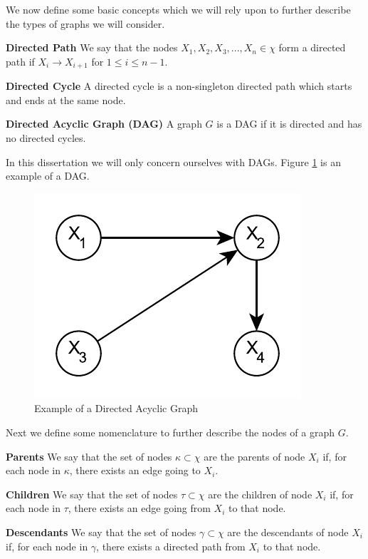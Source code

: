 \documentclass[../masters.tex]{subfiles}
\begin{document}
We now define some basic concepts which we will rely upon to further describe the types of graphs we will consider.
\begin{defn}
\textbf{Directed Path} We say that the nodes $X_1, X_2, X_3,..., X_n \in \chi$ form a directed path if $X_i \rightarrow X_{i+1}$ for $1 \leq i \leq n-1$. 
\end{defn}
\begin{defn}
\textbf{Directed Cycle} A directed cycle is a non-singleton directed path which starts and ends at the same node.
\end{defn}
\begin{defn}
\textbf{Directed Acyclic Graph (DAG)} A graph $G$ is a DAG if it is directed and has no directed cycles.
\end{defn}
In this dissertation we will only concern ourselves with DAGs. Figure \ref{fig_dag} is an example of a DAG.
\begin{figure}[H] 
\centering
\includegraphics[scale=1.0]{dag.pdf}
\caption{Example of a Directed Acyclic Graph}
\label{fig_dag}
\end{figure}
Next we define some nomenclature to further describe the nodes of a graph $G$.
\begin{defn}
\textbf{Parents} We say that the set of nodes $\kappa \subset \chi$ are the parents of node $X_i$ if, for each node in $\kappa$, there exists an edge going to $X_i$.
\end{defn}
\begin{defn}
\textbf{Children} We say that the set of nodes $\tau \subset \chi$ are the children of node $X_i$ if, for each node in $\tau$, there exists an edge going from $X_i$ to that node.
\end{defn}
\begin{defn}
\textbf{Descendants} We say that the set of nodes $\gamma \subset \chi$ are the descendants of node $X_i$ if, for each node in $\gamma$, there exists a directed path from $X_i$ to that node.
\end{defn}
\end{document}
